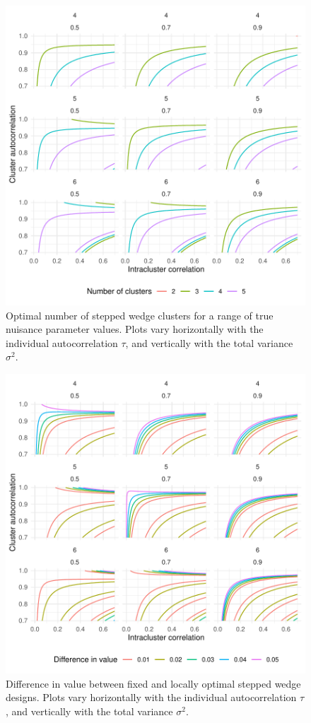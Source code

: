 \documentclass[sagev, Crown]{sagej}
\begin{document}
\begin{figure}
\centering
\includegraphics[scale=0.8]{./figures/opt_sw_k}
\caption{Optimal number of stepped wedge clusters for a range of true nuisance parameter values. Plots vary horizontally with the individual autocorrelation $\tau$, and vertically with the total variance $\sigma^2$.}
\label{fig:fixed_sw}
\end{figure}

\begin{figure}
\centering
\includegraphics[scale=0.8]{./figures/fixed_sw_k}
\caption{Difference in value between fixed and locally optimal stepped wedge designs. Plots vary horizontally with the individual autocorrelation $\tau$, and vertically with the total variance $\sigma^2$.}
\label{fig:fixed_sw}
\end{figure}
\end{document}
